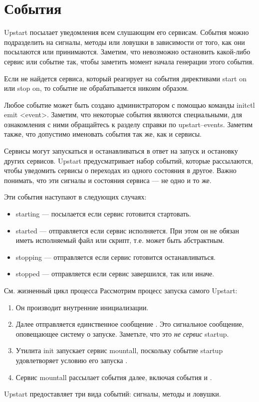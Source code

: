 \section{События}
Upstart посылает уведомления всем слушающим его сервисам. События можно подразделить на сигналы, методы или ловушки в зависимости от того, как они посылаются или принимаются. Заметим, что невозможно остановить какой-либо сервис или событие так, чтобы заметить момент начала генерации этого события.

Если не найдется сервиса, который реагирует на события директивами start on или stop on, то событие не обрабатывается никоим образом.

Любое событие может быть создано администратором с помощью команды initctl emit <event>. Заметим, что некоторые события являются специальными, для ознакомления с ними обращайтесь к разделу справки по upstart--events. Заметим также, что допустимо именовать события так же, как и сервисы.

Сервисы могут запускаться и останавливаться в ответ на запуск и остановку других сервисов. Upstart предусматривает набор событий, которые рассылаются, чтобы уведомить сервисы о переходах из одного состояния в другое. Важно понимать, что эти сигналы и состояния сервиса --- не одно и то же.

Эти события наступают в следующих случаях: \begin{itemize}
\item starting --- посылается если сервис готовится стартовать.
\item started --- отправляется если сервис исполняется. При этом он не обязан иметь исполняемый файл или скрипт,  т.е. может быть абстрактным.
\item stopping --- отправляется если сервис готовится останавливаться.
\item stopped --- отправляется если сервис завершился, так или иначе. 
\end{itemize}
См. жизненный цикл процесса %
Рассмотрим процесс запуска самого Upstart: \begin{enumerate}
\item Он производит внутренние инициализации.
\item Далее отправляется единственное сообщение . Это сигнальное сообщение, оповещающее систему о запуске. Заметьте, что это \textit{не сервис} startup.
\item Утилита init запускает сервис mountall, поскольку событие startup удовлетворяет условию его запуска .
\item Сервис mountall рассылает события далее, включая события  и . 
\end{enumerate}
Upstart предоставляет три вида событий: сигналы, методы и ловушки.

